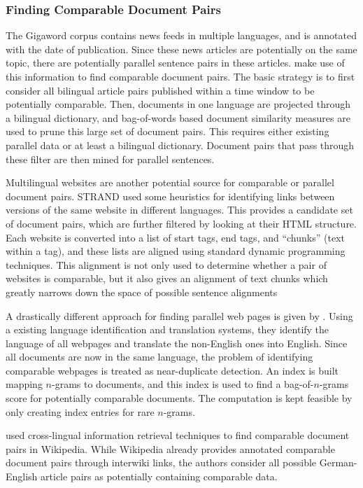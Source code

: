 \subsubsection{Finding Comparable Document Pairs}
The Gigaword corpus contains news feeds in multiple languages, and is annotated
with the date of publication. Since these news articles are potentially on the
same topic, there are potentially parallel sentence pairs in these articles.
\citet{Munteanu04,Munteanu05, Fung04a, Fung04b} make use of this information to
find comparable document pairs. The basic strategy is to first consider all
bilingual article pairs published within a time window to be potentially
comparable. Then, documents in one language are projected through a bilingual
dictionary, and bag-of-words based document similarity measures are used to
prune this large set of document pairs. This requires either existing parallel
data or at least a bilingual dictionary. Document pairs that pass through these
filter are then mined for parallel sentences.

Multilingual websites are another potential source for comparable or parallel
document pairs. STRAND \citep{Resnik03} used some heuristics for identifying
links between versions of the same website in different languages. This provides
a candidate set of document pairs, which are further filtered by looking at
their HTML structure. Each website is converted into a list of start tags, end
tags, and ``chunks'' (text within a tag), and these lists are aligned using
standard dynamic programming techniques. This alignment is not only used to
determine whether a pair of websites is comparable, but it also gives an
alignment of text chunks which greatly narrows down the space of possible
sentence alignments

A drastically different approach for finding parallel web pages is given by 
\citet{Uszkoreit10}. Using a existing language identification and translation
systems, they identify the language of all webpages and translate the
non-English ones into English. Since all documents are now in the same language,
the problem of identifying comparable webpages is treated as near-duplicate
detection. An index is built mapping $n$-grams to documents, and this index is
used to find a bag-of-$n$-grams score for potentially comparable documents. The
computation is kept feasible by only creating index entries for rare $n$-grams.

\citet{Ture12} used cross-lingual information retrieval techniques to find
comparable document pairs in Wikipedia. While Wikipedia already provides
annotated comparable document pairs through interwiki links, the authors
consider all possible German-English article pairs as potentially containing
comparable data.

